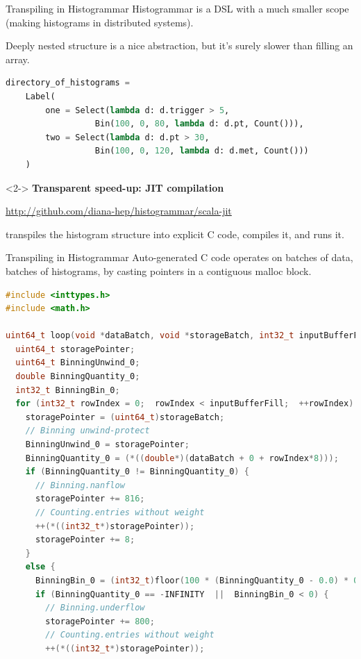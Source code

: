 \documentclass{beamer}
\begin{document}
\begin{frame}[fragile]{Transpiling in Histogrammar}
\vfill
Histogrammar is a DSL with a much smaller scope (making histograms in distributed systems).

\vfill
Deeply nested structure is a nice abstraction, but it's surely slower than filling an array.

\begin{lstlisting}[language=python, basicstyle=\ttfamily\scriptsize]
directory_of_histograms =
    Label(
        one = Select(lambda d: d.trigger > 5,
                  Bin(100, 0, 80, lambda d: d.pt, Count())),
        two = Select(lambda d: d.pt > 30,
                  Bin(100, 0, 120, lambda d: d.met, Count()))
    )
\end{lstlisting}

\vfill
\begin{uncoverenv}<2->
{\bf Transparent speed-up: JIT compilation}

\textcolor{blue}{\small \url{http://github.com/diana-hep/histogrammar/scala-jit}}

transpiles the histogram structure into explicit C code, compiles it, and runs it.
\end{uncoverenv}
\end{frame}

\begin{frame}[fragile]{Transpiling in Histogrammar}
\vspace{0.3 cm}
Auto-generated C code operates on batches of data, batches of histograms, by casting pointers in a contiguous malloc block.

\vfill
\begin{lstlisting}[language=c, basicstyle=\ttfamily\tiny]
#include <inttypes.h>
#include <math.h>

uint64_t loop(void *dataBatch, void *storageBatch, int32_t inputBufferFill) {
  uint64_t storagePointer;
  uint64_t BinningUnwind_0;
  double BinningQuantity_0;
  int32_t BinningBin_0;
  for (int32_t rowIndex = 0;  rowIndex < inputBufferFill;  ++rowIndex) {
    storagePointer = (uint64_t)storageBatch;
    // Binning unwind-protect
    BinningUnwind_0 = storagePointer;
    BinningQuantity_0 = (*((double*)(dataBatch + 0 + rowIndex*8)));
    if (BinningQuantity_0 != BinningQuantity_0) {
      // Binning.nanflow
      storagePointer += 816;
      // Counting.entries without weight
      ++(*((int32_t*)storagePointer));
      storagePointer += 8;
    }
    else {
      BinningBin_0 = (int32_t)floor(100 * (BinningQuantity_0 - 0.0) * 0.0125);
      if (BinningQuantity_0 == -INFINITY  ||  BinningBin_0 < 0) {
        // Binning.underflow
        storagePointer += 800;
        // Counting.entries without weight
        ++(*((int32_t*)storagePointer));
\end{lstlisting}
\end{frame}
\end{document}
